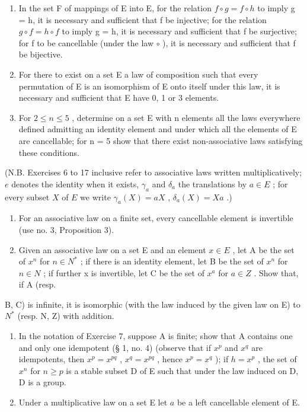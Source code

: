 \begin{enumerate}
\def\labelenumi{\arabic{enumi}.}
\setcounter{enumi}{2}
\item
  In the set F of mappings of E into E, for the relation \(f \circ g = f \circ h\) to imply g = h, it is necessary and sufficient that f be injective; for the relation \(g \circ f = h \circ f\) to imply g = h, it is necessary and sufficient that f be surjective; for f to be cancellable (under the law \(\circ\) ), it is necessary and sufficient that f be bijective.
\item
  For there to exist on a set E a law of composition such that every permutation of E is an isomorphism of E onto itself under this law, it is necessary and sufficient that E have 0, 1 or 3 elements.
\item
  For \(2 \leqslant n \leqslant 5\) , determine on a set E with n elements all the laws everywhere defined admitting an identity element and under which all the elements of E are cancellable; for n = 5 show that there exist non-associative laws satisfying these conditions.
\end{enumerate}

(N.B. Exercises 6 to 17 inclusive refer to associative laws written multiplicatively; \(e\) denotes the identity when it exists, \(\gamma_a\) and \(\delta_a\) the translations by \(a \in E\) ; for every subset \(X\) of \(E\) we write \(\gamma_a(X) = aX\) , \(\delta_a(X) = Xa\) .)

\begin{enumerate}
\def\labelenumi{\arabic{enumi}.}
\setcounter{enumi}{5}
\item
  For an associative law on a finite set, every cancellable element is invertible (use no. 3, Proposition 3).
\item
  Given an associative law on a set E and an element \(x \in E\) , let A be the set of \(x^{n}\) for \(n \in N^{*}\) ; if there is an identity element, let B be the set of \(x^{n}\) for \(n \in N\) ; if further x is invertible, let C be the set of \(x^{a}\) for \(a \in Z\) . Show that, if A (resp.
\end{enumerate}

B, C) is infinite, it is isomorphic (with the law induced by the given law on E) to \(N^{*}\) (resp. N, Z) with addition.

\begin{enumerate}
\def\labelenumi{\arabic{enumi}.}
\setcounter{enumi}{7}
\item
  In the notation of Exercise 7, suppose A is finite; show that A contains one and only one idempotent (§ 1, no. 4) (observe that if \(x^p\) and \(x^q\) are idempotents, then \(x^p = x^{pq}\) , \(x^q = x^{pq}\) , hence \(x^p = x^q\) ); if \(h = x^p\) , the set of \(x^n\) for \(n \geqslant p\) is a stable subset D of E such that under the law induced on D, D is a group.
\item
  Under a multiplicative law on a set E let \(a\) be a left cancellable element of E.
\end{enumerate}

